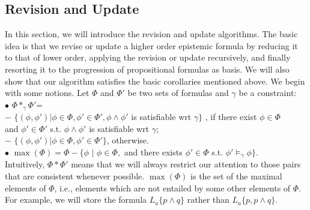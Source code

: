 \documentclass{llncs}
\begin{document}
\subsection{Revision and Update}
In this section, we will introduce the revision and update algorithms. The basic idea is that we revise or update a higher order epistemic formula by reducing it to that of lower order, applying the revision or update recursively, and finally resorting it to the progression of propositional formulas as basis. We will also show that our algorithm satisfies the basic corollaries mentioned above. We begin with some notions. Let $\Phi$ and $\Phi'$ be two sets of formulas and $\gamma$ be a constraint:\\
\hspace*{0.1in}$\bullet$ $\Phi*_\gamma\Phi'$=\\
\hspace*{0.1in}\quad $-$ $\{(\phi,\phi')|\phi\in\Phi,\phi'\in\Phi', \phi\land\phi'$ is satisfiable wrt $\gamma\}$ , if there exist $\phi\in\Phi$\\
\hspace*{0.1in}\quad\quad and $\phi'\in\Phi'$ s.t. $\phi\land\phi'$ is satisfiable wrt $\gamma$;\\
\hspace*{0.1in}\quad $-$ $\{(\phi,\phi')|\phi\in\Phi,\phi'\in\Phi'\}$, otherwise.\\
\hspace*{0.1in}$\bullet$ $\max{(\Phi)}=\Phi-\{\phi$ $|$ $\phi\in\Phi,$ and there exists $\phi'\in\Phi$ s.t. $\phi'\models_\gamma\phi\}$.\\
Intuitively, $\Phi*\Phi'$ means that we will always restrict our attention to those pairs that are consistent whenever possible. $\max{(\Phi)}$ is the set of the maximal elements of $\Phi$, i.e., elements which are not entailed by some other elements of $\Phi$.
For example, we will store the formula $L_a\{p\land q\}$ rather than $L_a\{p, p\land q\}$.\vspace{0.05in}\\
\end{document}
